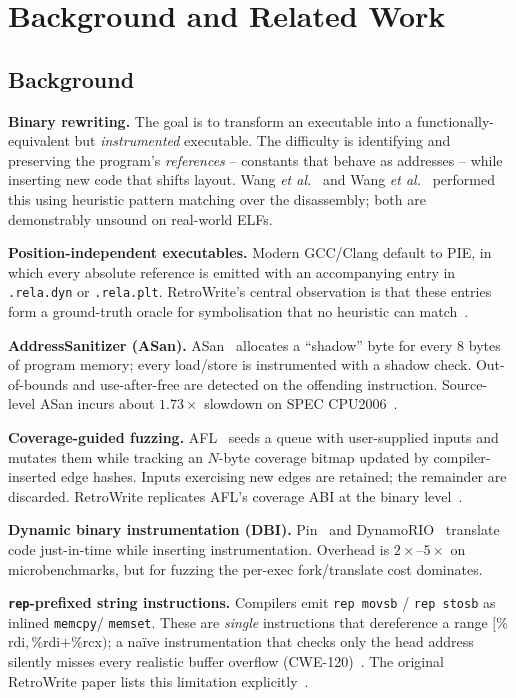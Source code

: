 \documentclass[10pt,a4paper]{article}
\begin{document}
\section{Background and Related Work}

\subsection{Background}

\textbf{Binary rewriting.} The goal is to transform an executable into a
functionally-equivalent but \emph{instrumented} executable. The difficulty is
identifying and preserving the program's \emph{references} -- constants that
behave as addresses -- while inserting new code that shifts layout. Wang
\emph{et al.}~\cite{uroboros} and Wang \emph{et al.}~\cite{ramblr} performed
this using heuristic pattern matching over the disassembly; both are
demonstrably unsound on real-world ELFs.

\textbf{Position-independent executables.} Modern GCC/Clang default to PIE, in
which every absolute reference is emitted with an accompanying entry in
\texttt{.rela.dyn} or \texttt{.rela.plt}. RetroWrite's central observation is
that these entries form a ground-truth oracle for symbolisation that no
heuristic can match~\cite{retrowrite}.

\textbf{AddressSanitizer (ASan).} ASan~\cite{asan} allocates a ``shadow''
byte for every 8 bytes of program memory; every load/store is instrumented
with a shadow check. Out-of-bounds and use-after-free are detected on the
offending instruction. Source-level ASan incurs about $1.73\times$
slowdown on SPEC CPU2006~\cite{asan}.

\textbf{Coverage-guided fuzzing.} AFL~\cite{afl} seeds a queue with
user-supplied inputs and mutates them while tracking an $N$-byte coverage
bitmap updated by compiler-inserted edge hashes. Inputs exercising new edges
are retained; the remainder are discarded. RetroWrite replicates AFL's coverage
ABI at the binary level~\cite{retrowrite}.

\textbf{Dynamic binary instrumentation (DBI).} Pin~\cite{pin} and
DynamoRIO~\cite{dynamorio} translate code just-in-time while inserting
instrumentation. Overhead is $2\times$--$5\times$ on micro\-benchmarks, but
for fuzzing the per-exec fork/translate cost dominates.

\textbf{\texttt{rep}-prefixed string instructions.} Compilers emit
\texttt{rep movsb} / \texttt{rep stosb} as inlined \texttt{memcpy}/%
\texttt{memset}. These are \emph{single} instructions that dereference a
range $[\%$rdi$, \%$rdi$+\%$rcx$)$; a na\"ive instrumentation that checks
only the head address silently misses every realistic buffer overflow
(CWE-120)~\cite{cwe120}. The original RetroWrite paper lists this limitation
explicitly~\cite{retrowrite}.
\end{document}
